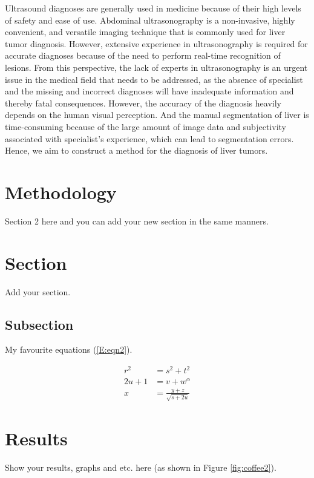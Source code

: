 \documentclass [11pt, twocolumn] {article}
\def \bea{\begin{eqnarray}}
\def \eea{\end{eqnarray}}
\begin{document}
Ultrasound diagnoses are generally used in medicine because of their high levels of safety and ease of use\cite{r8}. Abdominal ultrasonography is a non-invasive, highly convenient, and versatile imaging technique that is commonly used for liver tumor diagnosis. However, extensive experience in ultrasonography is required for accurate diagnoses because of the need to perform real-time recognition of lesions. From this perspective, the lack of experts in ultrasonography is an urgent issue in the medical field that needs to be addressed, as the absence of specialist and the missing and incorrect diagnoses will have inadequate information and thereby fatal consequences. However, the accuracy of the diagnosis heavily depends on the human visual perception. And the manual segmentation of liver is time-consuming because of the large amount of image data and subjectivity associated with specialist's experience, which can lead to segmentation errors. Hence, we aim to construct a method for the diagnosis of liver tumors.

\section{Methodology}
Section 2 here and you can add your new section in the same manners.\cite{ref1, ref3, ref5, ref5a, ref6M, ref6D}

\section{Section}
Add your section.
 
\subsection{Subsection}
My favourite equations (\ref{E:eqn2}).

\bea
r^{2}	&= s^{2} + t^{2}				\label{E:eqn1}\\
2u+1	&= v+w^{\alpha}					\label{E:eqn2}\\
x		&= \frac{y + z}{\sqrt{s + 2u}}	\label{E:eqn3}
\eea


\section{Results}
Show your results, graphs and etc. here (as shown in Figure \ref{fig:coffee2}).
\end{document}
